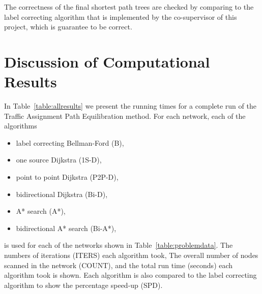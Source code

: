 The correctness of the final shortest path trees are checked by comparing to the label correcting algorithm that is implemented by the co-supervisor of this project, which is guarantee to be correct.

\section{Discussion of Computational Results}
In Table~\ref{table:allresults} we present the running times for a complete run of the Traffic Assignment Path Equilibration method.
For each network, each of the algorithms
\begin{itemize}
    \item label correcting Bellman-Ford (B),
    \item one source Dijkstra (1S-D),
    \item point to point Dijkstra (P2P-D),
    \item bidirectional Dijkstra (Bi-D),
    \item A* search (A*),
    \item bidirectional A* search (Bi-A*),
\end{itemize}
is used for each of the networks shown in Table~\ref{table:problemdata}.
The numbers of iterations (ITERS) each algorithm took,
The overall number of nodes scanned in the network (COUNT),
and the total run time (seconds) each algorithm took is shown.
Each algorithm is also compared to the label correcting algorithm to show the percentage speed-up (SPD).

